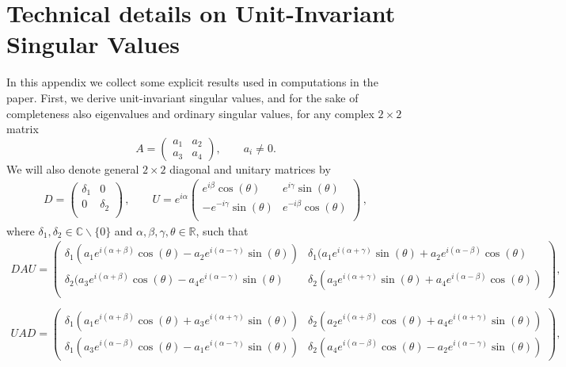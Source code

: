 \documentclass[11pt,a4paper]{article}
\begin{document}
\section{Technical details on Unit-Invariant Singular Values}\label{sec:2x2matrix-derivation}
In this appendix we collect some explicit results used in computations in the paper. First, we derive unit-invariant singular values, and for the sake of completeness also eigenvalues and ordinary singular values, for any complex $2\times 2$ matrix 
\begin{equation}
A = \begin{pmatrix}
a_1 & a_2 \\
a_3 & a_4
\end{pmatrix}, \qquad a_i\neq0.
\end{equation}
We will also denote general $2\times2$ diagonal and unitary matrices by
\begin{eqnarray}
D=\left(
\begin{array}{cc}
 \delta_1 & 0 \\
 0 & \delta_2 \\
\end{array}
\right)\,,\qquad U=e^{i\alpha}\left(
\begin{array}{cc}
 e^{i \beta } \cos (\theta ) & e^{i \gamma } \sin (\theta ) \\
 -e^{-i \gamma } \sin (\theta ) & e^{-i \beta } \cos (\theta ) \\
\end{array}
\right)\,,
\end{eqnarray}
where $\delta_1,\delta_2\in\mathbb{C}\backslash\{0\}$ and $\alpha,\beta,\gamma,\theta\in\mathbb{R}$, such that
\begin{eqnarray}
DAU=\left(
\begin{array}{cc}
 \delta_1(a_1 e^{i (\alpha +\beta) } \cos (\theta )-a_2 e^{i (\alpha -\gamma) }
 \sin (\theta)) & \delta_1(a_1 e^{i (\alpha +\gamma) } \sin (\theta )+a_2 e^{i(
 \alpha -\beta) } \cos (\theta ) \\
 \delta_2(a_3 e^{i (\alpha +\beta) } \cos (\theta )-a_4 e^{i (\alpha -\gamma) }
 \sin (\theta ) & \delta_2(a_3 e^{i (\alpha +\gamma) } \sin (\theta )+a_4 e^{i(
 \alpha -\beta) } \cos (\theta )) \\
\end{array}\right),\nonumber\\\label{eq:DAU}
\end{eqnarray}
\begin{eqnarray}
UAD=\left(
\begin{array}{cc}
 \delta_1 \left(a_1 e^{i (\alpha +\beta) } \cos (\theta )+a_3 e^{i (\alpha +\gamma) } \sin
 (\theta )\right) & \delta_2 \left(a_2 e^{i (\alpha +\beta) } \cos (\theta )+a_4 e^{i
 (\alpha +\gamma) } \sin (\theta )\right) \\
 \delta_1 \left(a_3 e^{i (\alpha -\beta) } \cos (\theta )-a_1 e^{i (\alpha -\gamma) } \sin
 (\theta )\right) & \delta_2 \left(a_4 e^{i (\alpha -\beta) } \cos (\theta )-a_2 e^{i
 (\alpha -\gamma) } \sin (\theta )\right) 
\end{array}\right),\nonumber\\ \label{eq:UADp}
\end{eqnarray}
\end{document}
